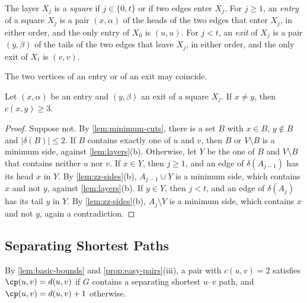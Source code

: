 \begin{definition}[Squares]
\label{def:squares}
The layer $X_j$ is a \emph{square} if $j \in \{0, t\}$ or if two edges enter $X_j$.
For $j \geq 1$, an \emph{entry} of a square $X_j$ is a pair $(x, \alpha)$ of the heads of the two edges that enter $X_j$, in either order, and the only entry of $X_0$ is $(u, u)$.
For $j < t$, an \emph{exit} of $X_j$ is a pair $(y, \beta)$ of the tails of the two edges that leave $X_j$, in either order, and the only exit of $X_t$ is $(v, v)$.
\end{definition}

The two vertices of an entry or of an exit may coincide.

\begin{lemma}
\label{lem:terminals}
Let $(x, \alpha)$ be an entry and $(y, \beta)$ an exit of a square $X_j$.
If $x \neq y$, then $c(x, y) \geq 3$.
\end{lemma}

\begin{proof}
Suppose not.
By \cref{lem:minimum-cuts}, there is a set $B$ with $x \in B$, $y \notin B$ and $|\delta(B)| \leq 2$.
If $B$ contains exactly one of $u$ and $v$, then $B$ or $V \setminus B$ is a minimum side, against \cref{lem:layers}(b).
Otherwise, let $Y$ be the one of $B$ and $V \setminus B$ that contains neither $u$ nor $v$.
If $x \in Y$, then $j \geq 1$, and an edge of $\delta(A_{j-1})$ has its head $x$ in $Y$.
By \cref{lem:zz-sides}(b), $A_{j-1} \cup Y$ is a minimum side, which contains $x$ and not $y$, against \cref{lem:layers}(b).
If $y \in Y$, then $j < t$, and an edge of $\delta(A_j)$ has its tail $y$ in $Y$.
By \cref{lem:zz-sides}(b), $A_j \setminus Y$ is a minimum side, which contains $x$ and not $y$, again a contradiction.
\end{proof}

\subsection{Separating Shortest Paths}
\label{sec:separating}

By \cref{lem:basic-bounds} and \cref{prop:easy-pairs}(iii), a pair with $c(u, v) = 2$ satisfies $\cp(u, v) = d(u, v)$ if $G$ contains a separating shortest $u$--$v$ path, and $\cp(u, v) = d(u, v) + 1$ otherwise.

